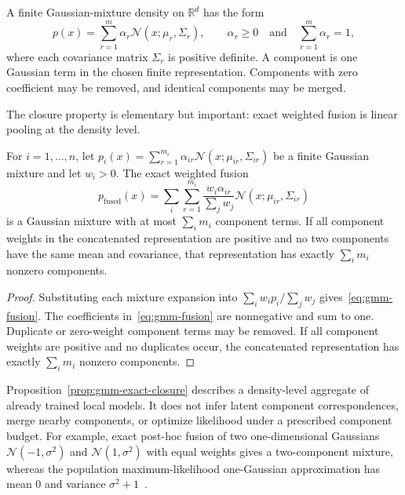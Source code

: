 \documentclass[runningheads]{llncs}
\newcommand{\R}{\mathbb{R}}
\newcommand{\N}{\mathcal{N}}
\begin{document}
A finite Gaussian-mixture density on $\R^d$ has the form
\begin{equation}
  p(x)=\sum_{r=1}^m \alpha_r\N(x;\mu_r,\Sigma_r),
  \qquad
  \alpha_r\geq0
  \quad\text{and}\quad
  \sum_{r=1}^m\alpha_r=1,
  \label{eq:gmm}
\end{equation}
where each covariance matrix $\Sigma_r$ is positive definite. A component is one Gaussian term in the chosen finite representation. Components with zero coefficient may be removed, and identical components may be merged.

The closure property is elementary but important: exact weighted fusion is
linear pooling at the density level.


\begin{proposition}
\label{prop:gmm-exact-closure}
For $i=1,\ldots,n$, let $p_i(x)=\sum_{r=1}^{m_i}\alpha_{ir}\N(x;\mu_{ir},\Sigma_{ir})$ be a finite Gaussian mixture and let $w_i>0$. The exact weighted fusion
\begin{equation}
  p_{\mathrm{fused}}(x)
  =
  \sum_i\sum_{r=1}^{m_i}
  \frac{w_i\alpha_{ir}}{\sum_jw_j}
  \N(x;\mu_{ir},\Sigma_{ir})
  \label{eq:gmm-fusion}
\end{equation}
 is a Gaussian mixture with at most $\sum_i m_i$ component terms. If all component weights in the concatenated representation are positive and no two components have the same mean and covariance, that representation has exactly $\sum_i m_i$ nonzero components.
\end{proposition}
\begin{proof}
Substituting each mixture expansion into $\sum_i w_i p_i/\sum_j w_j$
gives~\eqref{eq:gmm-fusion}. The coefficients in~\eqref{eq:gmm-fusion} are nonnegative and sum to one. Duplicate or zero-weight component terms may be removed. If all component weights are positive and no duplicates occur, the concatenated representation has exactly $\sum_i m_i$ nonzero components.
\end{proof}


Proposition~\ref{prop:gmm-exact-closure} describes a density-level aggregate of already trained local models. It does not infer latent component correspondences, merge nearby components, or optimize likelihood under a prescribed component budget. For example, exact post-hoc fusion of two one-dimensional Gaussians $\N(-1,\sigma^2)$ and $\N(1,\sigma^2)$ with equal weights gives a two-component mixture, whereas the population maximum-likelihood one-Gaussian approximation has mean $0$ and variance $\sigma^2+1$~\cite{dempster1977maximum,mclachlan2000finite}.
\end{document}
